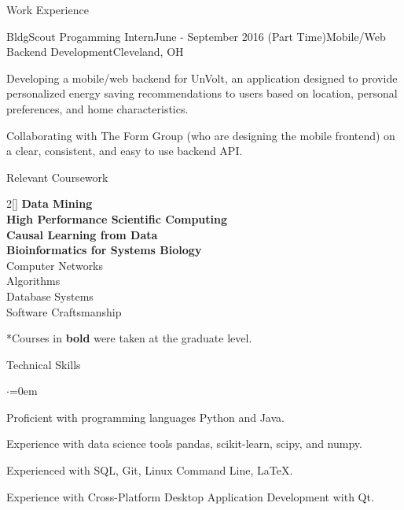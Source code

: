 \documentclass{resume} %
\begin{document}
\begin{rSection}{Work Experience}
\begin{rSubsection}{BldgScout Progamming Intern}{June - September 2016 (Part Time)}{Mobile/Web Backend Development}{Cleveland, OH}
\item Developing a mobile/web backend for UnVolt, an application designed to provide personalized energy saving recommendations to users based on location, personal preferences, and home characteristics.
\item Collaborating with The Form Group (who are designing the mobile frontend) on a clear, consistent, and easy to use backend API.

\end{rSubsection}

\end{rSection}


\begin{rSection}{Relevant Coursework}
\begin{multicols}{2}[]
\textbf{Data Mining} \\
\textbf{High Performance Scientific Computing} \\
\textbf{Causal Learning from Data} \\
\textbf{Bioinformatics for Systems Biology} \\ 
Computer Networks \\
Algorithms \\
Database Systems \\
Software Craftsmanship
\end{multicols}
\vspace{-1.0em}
*Courses in \textbf{bold} were taken at the graduate level.
\end{rSection}



\begin{rSection}{Technical Skills}
\begin{list}{$\cdot$}{\leftmargin=0em}
\item Proficient with programming languages Python and Java.
\vspace{-0.5em}
\item Experience with data science tools pandas, scikit-learn, scipy, and numpy.
\vspace{-0.5em}
\item Experienced with SQL, Git, Linux Command Line, LaTeX.
\vspace{-0.5em}
\item Experience with Cross-Platform Desktop Application Development with Qt.
\vspace{-0.5em}
\end{list}
\end{rSection}
\end{document}
